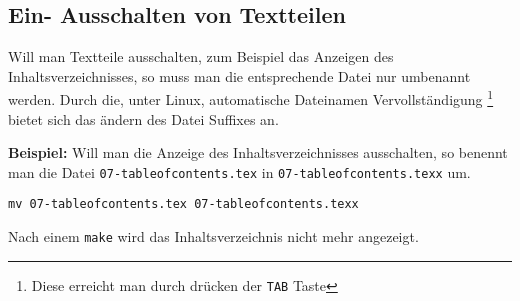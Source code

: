 \subsection{Ein- Ausschalten von Textteilen}
\label{sec:ein_ausschalten_von_textteilen}

Will man Textteile ausschalten, zum Beispiel das Anzeigen
des Inhaltsverzeichnisses, so muss man die entsprechende Datei
nur umbenannt werden.
Durch die, unter Linux, automatische Dateinamen Vervollständigung%
\footnote{Diese erreicht man durch drücken der \texttt{TAB} Taste}
bietet sich das ändern des Datei Suffixes an.

\textbf{Beispiel:} Will man die Anzeige des Inhaltsverzeichnisses ausschalten,
so benennt man die Datei 
\texttt{07-tableof\-contents\-.tex} in \texttt{07-tableof\-contents\-.texx}
um.

\begin{verbatim}
mv 07-tableofcontents.tex 07-tableofcontents.texx
\end{verbatim}

Nach einem \verb!make! wird das Inhaltsverzeichnis nicht mehr angezeigt.



